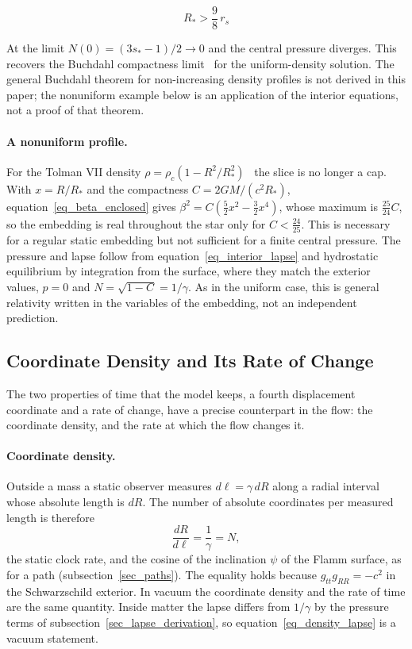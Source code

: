 \documentclass[anonymous]{iopjournal}
\begin{document}
\begin{equation}
    R_*>\frac{9}{8}\,r_s
\end{equation}

At the limit $N(0)=(3s_*-1)/2\to0$ and the central pressure diverges. This recovers the Buchdahl compactness limit~\cite{Buchdahl1959} for the uniform-density solution. The general Buchdahl theorem for non-increasing density profiles is not derived in this paper; the nonuniform example below is an application of the interior equations, not a proof of that theorem.

\paragraph{A nonuniform profile.} For the Tolman VII density $\rho=\rho_c\left(1-R^2/R_*^2\right)$~\cite{Tolman1939} the slice is no longer a cap. With $x=R/R_*$ and the compactness $C=2GM/(c^2R_*)$, equation~\eqref{eq_beta_enclosed} gives $\beta^2=C\left(\tfrac52x^2-\tfrac32x^4\right)$, whose maximum is $\tfrac{25}{24}C$, so the embedding is real throughout the star only for $C<\tfrac{24}{25}$. This is necessary for a regular static embedding but not sufficient for a finite central pressure. The pressure and lapse follow from equation~\eqref{eq_interior_lapse} and hydrostatic equilibrium by integration from the surface, where they match the exterior values, $p=0$ and $N=\sqrt{1-C}=1/\gamma$. As in the uniform case, this is general relativity written in the variables of the embedding, not an independent prediction.

\subsection{Coordinate Density and Its Rate of Change}\label{sec_coordinate_density}

The two properties of time that the model keeps, a fourth displacement coordinate and a rate of change, have a precise counterpart in the flow: the coordinate density, and the rate at which the flow changes it.

\paragraph{Coordinate density.} Outside a mass a static observer measures $d\ell=\gamma\,dR$ along a radial interval whose absolute length is $dR$. The number of absolute coordinates per measured length is therefore
\begin{equation}\label{eq_density_lapse}
    \frac{dR}{d\ell}=\frac{1}{\gamma}=N ,
\end{equation}
the static clock rate, and the cosine of the inclination $\psi$ of the Flamm surface, as for a path (subsection~\ref{sec_paths}). The equality holds because $g_{tt}g_{RR}=-c^2$ in the Schwarzschild exterior. In vacuum the coordinate density and the rate of time are the same quantity. Inside matter the lapse differs from $1/\gamma$ by the pressure terms of subsection~\ref{sec_lapse_derivation}, so equation~\eqref{eq_density_lapse} is a vacuum statement.
\end{document}
